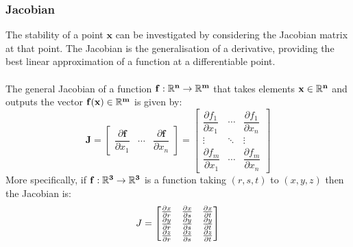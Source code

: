 \subsubsection{Jacobian}
The stability of a point $\mathbf{x}$ can be investigated by considering the Jacobian matrix at that point. The Jacobian is the generalisation of a derivative, providing the best linear approximation of a function at a differentiable point.\\
\\
The general Jacobian of a function $\bf{f}:\mathbb{R}^n\rightarrow\mathbb{R}^m$ that takes elements $\bf{x}\in\mathbb{R}^n$ and outputs the vector $\bf{f}(\bf{x})\in\mathbb{R}^m$ is given by:
\begin{equation*}
{\displaystyle \mathbf {J} ={\begin{bmatrix}{\dfrac {\partial \mathbf {f} }{\partial x_{1}}}&\cdots &{\dfrac {\partial \mathbf {f} }{\partial x_{n}}}\end{bmatrix}}={\begin{bmatrix}{\dfrac {\partial f_{1}}{\partial x_{1}}}&\cdots &{\dfrac {\partial f_{1}}{\partial x_{n}}}\\\vdots &\ddots &\vdots \\{\dfrac {\partial f_{m}}{\partial x_{1}}}&\cdots &{\dfrac {\partial f_{m}}{\partial x_{n}}}\end{bmatrix}}}
\end{equation*}
More specifically, if $\bf{f}:\mathbb{R}^3\rightarrow\mathbb{R}^3$ is a function taking $(r,s,t)$ to $(x,y,z)$ then the Jacobian is:
\begin{equation*}
J
={\begin{bmatrix}{\partial x \over \partial r} & {\partial x\over \partial s} & {\partial x \over \partial t} \cr 
		{\partial y \over \partial r} & {\partial y\over \partial s} & {\partial y \over \partial t} \cr 
		{\partial z \over \partial r} & {\partial z\over \partial s} & {\partial z \over \partial t}\end{bmatrix}}
\end{equation*}

